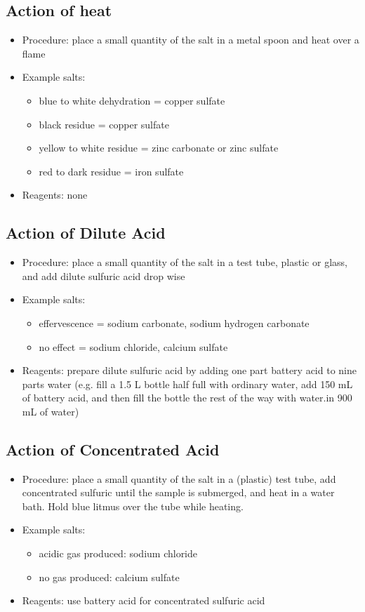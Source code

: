 \subsection{Action of heat}
\begin{itemize}
\item{Procedure: place a small quantity of the salt 
in a metal spoon and heat over a flame}
\item{Example salts:} 
\begin{itemize}
\item{blue to white dehydration = copper sulfate}
\item{black residue = copper sulfate}
\item{yellow to white residue = zinc carbonate or zinc sulfate} 
\item{red to dark residue = iron sulfate}
\end{itemize}
\item{Reagents: none}
\end{itemize}

\subsection{Action of Dilute Acid} 
\begin{itemize}
\item{Procedure: place a small quantity of the salt in a test tube, 
plastic or glass, 
and add dilute sulfuric acid drop wise}
\item{Example salts:}
\begin{itemize}
\item{effervescence = sodium carbonate, 
sodium hydrogen carbonate}
\item{no effect = sodium chloride, 
calcium sulfate}
\end{itemize}
\item{Reagents: prepare dilute sulfuric acid 
by adding one part battery acid to nine parts water (e.g. 
fill a 1.5 L bottle half full with ordinary water, 
add 150 mL of battery acid, 
and then fill the bottle the rest of the way 
with water.in 900 mL of water)}
\end{itemize}

\subsection{Action of Concentrated Acid}
\begin{itemize}
\item{Procedure: place a small quantity of the salt in a (plastic) test tube, 
add concentrated sulfuric until the sample is submerged, 
and heat in a water bath. 
Hold blue litmus over the tube while heating.}
\item{Example salts:}
\begin{itemize}
\item{acidic gas produced: sodium chloride}
\item{no gas produced: calcium sulfate}
\end{itemize}
\item{Reagents: use battery acid for concentrated sulfuric acid}
\end{itemize}

